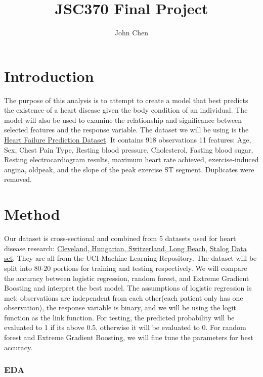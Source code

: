 \documentclass[
]{article}
\title{JSC370 Final Project}
\author{John Chen}
\date{}
\begin{document}
\maketitle

\hypertarget{introduction}{%
\section{Introduction}\label{introduction}}

The purpose of this analysis is to attempt to create a model that best
predicts the existence of a heart disease given the body condition of an
individual. The model will also be used to examine the relationship and
significance between selected features and the response variable. The
dataset we will be using is the
\href{https://www.kaggle.com/datasets/fedesoriano/heart-failure-prediction/data}{Heart
Failure Prediction Dataset}. It contains 918 observations 11 features:
Age, Sex, Chest Pain Type, Resting blood pressure, Cholesterol, Fasting
blood sugar, Resting electrocardiogram results, maximum heart rate
achieved, exercise-induced angina, oldpeak, and the slope of the peak
exercise ST segment. Duplicates were removed.

\hypertarget{method}{%
\section{Method}\label{method}}

Our dataset is cross-sectional and combined from 5 datasets used for
heart disease research:
\href{https://archive.ics.uci.edu/dataset/45/heart+disease}{Cleveland,
Hungarian, Switzerland, Long Beach},
\href{https://archive.ics.uci.edu/dataset/145/statlog+heart}{Stalog Data
set}. They are all from the UCI Machine Learning Repository. The dataset
will be split into 80-20 portions for training and testing respectively.
We will compare the accuracy between logistic regression, random forest,
and Extreme Gradient Boosting and interpret the best model. The
assumptions of logistic regression is met: observations are independent
from each other(each patient only has one observation), the response
variable is binary, and we will be using the logit function as the link
function. For testing, the predicted probability will be evaluated to 1
if its above 0.5, otherwise it will be evaluated to 0. For random forest
and Extreme Gradient Boosting, we will fine tune the parameters for best
accuracy.

\hypertarget{eda}{%
\subsubsection{EDA}\label{eda}}
\end{document}

